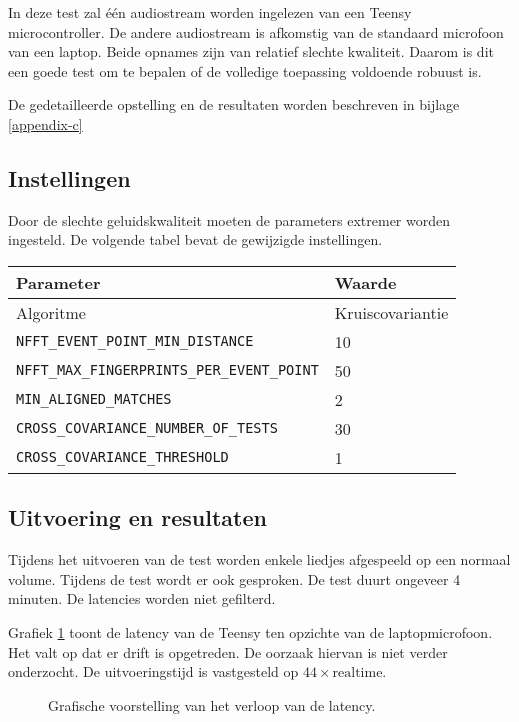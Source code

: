 In deze test zal één audiostream worden ingelezen van een Teensy microcontroller. De andere audiostream is afkomstig van de standaard microfoon van een laptop. Beide opnames zijn van relatief slechte kwaliteit. Daarom is dit een goede test om te bepalen of de volledige toepassing voldoende robuust is.

De gedetailleerde opstelling en de resultaten worden beschreven in bijlage \ref{appendix-c}

\subsection{Instellingen}

Door de slechte geluidskwaliteit moeten de parameters extremer worden ingesteld. De volgende tabel bevat de gewijzigde instellingen.

\begin{tabular}{ l  l}
	\hline
	\textbf{Parameter} & \textbf{Waarde} \\
	\hline
	Algoritme & Kruiscovariantie \\
	\texttt{NFFT\_EVENT\_POINT\_MIN\_DISTANCE} & 10 \\
	\texttt{NFFT\_MAX\_FINGERPRINTS\_PER\_EVENT\_POINT} & 50 \\
	\texttt{MIN\_ALIGNED\_MATCHES} & 2 \\
	\texttt{CROSS\_COVARIANCE\_NUMBER\_OF\_TESTS} & 30 \\
	\texttt{CROSS\_COVARIANCE\_THRESHOLD} & 1
\end{tabular}

\subsection{Uitvoering en resultaten}

Tijdens het uitvoeren van de test worden enkele liedjes afgespeeld op een normaal volume. Tijdens de test wordt er ook gesproken. De test duurt ongeveer 4 minuten. De latencies worden niet gefilterd.

Grafiek \ref{test-latency-graph} toont de latency van de Teensy ten opzichte van de laptopmicrofoon. Het valt op dat er drift is opgetreden. De oorzaak hiervan is niet verder onderzocht. De uitvoeringstijd is vastgesteld op $ 44 \times \textrm{realtime} $.

\begin{figure}[h!]
	\captionsetup{width=0.7\textwidth}
	\caption[Praktijktest resultaten]{Grafische voorstelling van het verloop van de latency.}
	\begin{center}
		\advance\parskip0.3cm
		
	\end{center}
	\label{test-latency-graph}
\end{figure}

